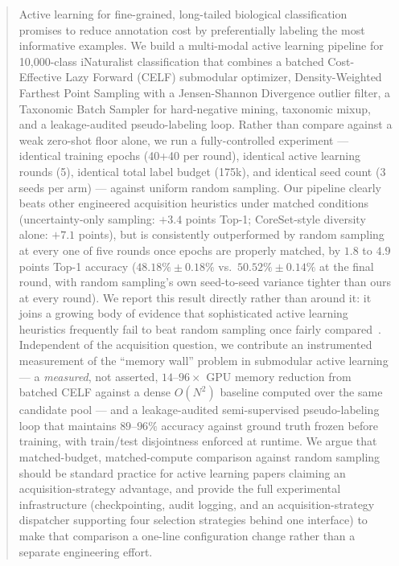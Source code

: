 \documentclass[conference]{IEEEtran}
\begin{document}
\begin{abstract}
Active learning for fine-grained, long-tailed biological classification promises to reduce annotation cost by preferentially labeling the most informative examples. We build a multi-modal active learning pipeline for 10,000-class iNaturalist classification that combines a batched Cost-Effective Lazy Forward (CELF) submodular optimizer, Density-Weighted Farthest Point Sampling with a Jensen-Shannon Divergence outlier filter, a Taxonomic Batch Sampler for hard-negative mining, taxonomic mixup, and a leakage-audited pseudo-labeling loop. Rather than compare against a weak zero-shot floor alone, we run a fully-controlled experiment — identical training epochs (40+40 per round), identical active learning rounds (5), identical total label budget (175k), and identical seed count (3 seeds per arm) — against uniform random sampling. Our pipeline clearly beats other engineered acquisition heuristics under matched conditions (uncertainty-only sampling: $+3.4$ points Top-1; CoreSet-style diversity alone: $+7.1$ points), but is consistently outperformed by random sampling at every one of five rounds once epochs are properly matched, by $1.8$ to $4.9$ points Top-1 accuracy ($48.18\% \pm 0.18\%$ vs.\ $50.52\% \pm 0.14\%$ at the final round, with random sampling's own seed-to-seed variance tighter than ours at every round). We report this result directly rather than around it: it joins a growing body of evidence that sophisticated active learning heuristics frequently fail to beat random sampling once fairly compared~\cite{mittal2019parting,munjal2022towards}. Independent of the acquisition question, we contribute an instrumented measurement of the ``memory wall'' problem in submodular active learning — a \emph{measured}, not asserted, $14$--$96\times$ GPU memory reduction from batched CELF against a dense $O(N^2)$ baseline computed over the same candidate pool — and a leakage-audited semi-supervised pseudo-labeling loop that maintains $89$--$96\%$ accuracy against ground truth frozen before training, with train/test disjointness enforced at runtime. We argue that matched-budget, matched-compute comparison against random sampling should be standard practice for active learning papers claiming an acquisition-strategy advantage, and provide the full experimental infrastructure (checkpointing, audit logging, and an acquisition-strategy dispatcher supporting four selection strategies behind one interface) to make that comparison a one-line configuration change rather than a separate engineering effort.
\end{abstract}
\end{document}
